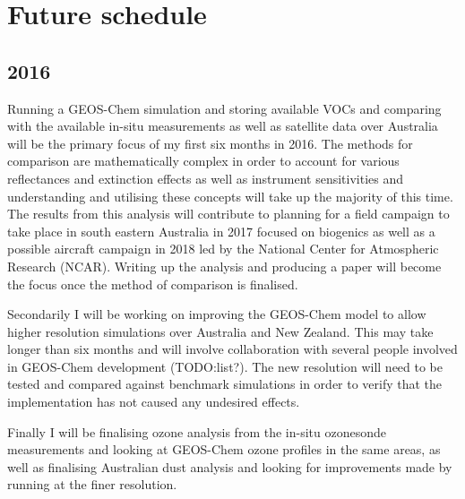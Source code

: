 \section{Future schedule}

\subsection{2016}

Running a GEOS-Chem simulation and storing available VOCs and comparing with the available in-situ measurements as well as satellite data over Australia will be the primary focus of my first six months in 2016.
The methods for comparison are mathematically complex in order to account for various reflectances and extinction effects as well as instrument sensitivities and understanding and utilising these concepts will take up the majority of this time.
The results from this analysis will contribute to planning for a field campaign to take place in south eastern Australia in 2017 focused on biogenics as well as a possible aircraft campaign in 2018 led by the National Center for Atmospheric Research (NCAR).
Writing up the analysis and producing a paper will become the focus once the method of comparison is finalised.

Secondarily I will be working on improving the GEOS-Chem model to allow higher resolution simulations over Australia and New Zealand.
This may take longer than six months and will involve collaboration with several people involved in GEOS-Chem development (TODO:list?).
The new resolution will need to be tested and compared against benchmark simulations in order to verify that the implementation has not caused any undesired effects.

Finally I will be finalising ozone analysis from the in-situ ozonesonde measurements and looking at GEOS-Chem ozone profiles in the same areas, as well as finalising Australian dust analysis and looking for improvements made by running at the finer resolution.

